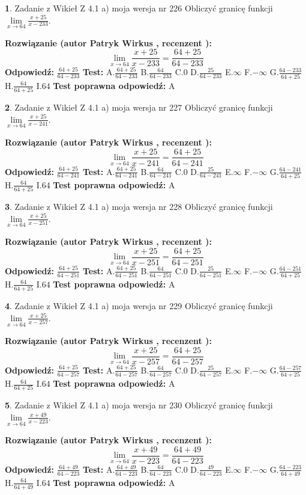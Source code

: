 \documentclass[12pt, a4paper]{article}
\theoremstyle{definition} %
\newtheorem{zad}{}
\newcommand{\zadStart}[1]{\begin{zad}#1\newline}
\newcommand{\zadStop}{\end{zad}}
\newcommand{\rozwStart}[2]{\noindent \textbf{Rozwiązanie (autor #1 , recenzent #2): }\newline}
\newcommand{\rozwStop}{\newline}
\newcommand{\odpStart}{\noindent \textbf{Odpowiedź:}\newline}
\newcommand{\odpStop}{\newline}
\newcommand{\testStart}{\noindent \textbf{Test:}\newline}
\newcommand{\testStop}{\newline}
\newcommand{\kluczStart}{\noindent \textbf{Test poprawna odpowiedź:}\newline}
\newcommand{\kluczStop}{\newline}
\begin{document}
\zadStart{Zadanie z Wikieł Z 4.1 a) moja wersja nr 226}
Obliczyć granicę funkcji $\lim\limits_{x\to64}\frac{x+25}{x-233}$.
\zadStop
\rozwStart{Patryk Wirkus}{}
$$\lim\limits_{x\to64}\frac{x+25}{x-233} = \frac{64+25}{64-233}$$
\rozwStop
\odpStart
$\frac{64+25}{64-233}$
\odpStop
\testStart
A.$\frac{64+25}{64-233}$
B.$\frac{64}{64-233}$
C.$0$
D.$\frac{25}{64-233}$
E.$\infty$
F.$-\infty$
G.$\frac{64-233}{64+25}$
H.$\frac{64}{64+25}$
I.$64$
\testStop
\kluczStart
A
\kluczStop



\zadStart{Zadanie z Wikieł Z 4.1 a) moja wersja nr 227}
Obliczyć granicę funkcji $\lim\limits_{x\to64}\frac{x+25}{x-241}$.
\zadStop
\rozwStart{Patryk Wirkus}{}
$$\lim\limits_{x\to64}\frac{x+25}{x-241} = \frac{64+25}{64-241}$$
\rozwStop
\odpStart
$\frac{64+25}{64-241}$
\odpStop
\testStart
A.$\frac{64+25}{64-241}$
B.$\frac{64}{64-241}$
C.$0$
D.$\frac{25}{64-241}$
E.$\infty$
F.$-\infty$
G.$\frac{64-241}{64+25}$
H.$\frac{64}{64+25}$
I.$64$
\testStop
\kluczStart
A
\kluczStop



\zadStart{Zadanie z Wikieł Z 4.1 a) moja wersja nr 228}
Obliczyć granicę funkcji $\lim\limits_{x\to64}\frac{x+25}{x-251}$.
\zadStop
\rozwStart{Patryk Wirkus}{}
$$\lim\limits_{x\to64}\frac{x+25}{x-251} = \frac{64+25}{64-251}$$
\rozwStop
\odpStart
$\frac{64+25}{64-251}$
\odpStop
\testStart
A.$\frac{64+25}{64-251}$
B.$\frac{64}{64-251}$
C.$0$
D.$\frac{25}{64-251}$
E.$\infty$
F.$-\infty$
G.$\frac{64-251}{64+25}$
H.$\frac{64}{64+25}$
I.$64$
\testStop
\kluczStart
A
\kluczStop



\zadStart{Zadanie z Wikieł Z 4.1 a) moja wersja nr 229}
Obliczyć granicę funkcji $\lim\limits_{x\to64}\frac{x+25}{x-257}$.
\zadStop
\rozwStart{Patryk Wirkus}{}
$$\lim\limits_{x\to64}\frac{x+25}{x-257} = \frac{64+25}{64-257}$$
\rozwStop
\odpStart
$\frac{64+25}{64-257}$
\odpStop
\testStart
A.$\frac{64+25}{64-257}$
B.$\frac{64}{64-257}$
C.$0$
D.$\frac{25}{64-257}$
E.$\infty$
F.$-\infty$
G.$\frac{64-257}{64+25}$
H.$\frac{64}{64+25}$
I.$64$
\testStop
\kluczStart
A
\kluczStop



\zadStart{Zadanie z Wikieł Z 4.1 a) moja wersja nr 230}
Obliczyć granicę funkcji $\lim\limits_{x\to64}\frac{x+49}{x-223}$.
\zadStop
\rozwStart{Patryk Wirkus}{}
$$\lim\limits_{x\to64}\frac{x+49}{x-223} = \frac{64+49}{64-223}$$
\rozwStop
\odpStart
$\frac{64+49}{64-223}$
\odpStop
\testStart
A.$\frac{64+49}{64-223}$
B.$\frac{64}{64-223}$
C.$0$
D.$\frac{49}{64-223}$
E.$\infty$
F.$-\infty$
G.$\frac{64-223}{64+49}$
H.$\frac{64}{64+49}$
I.$64$
\testStop
\kluczStart
A
\kluczStop
\end{document}
